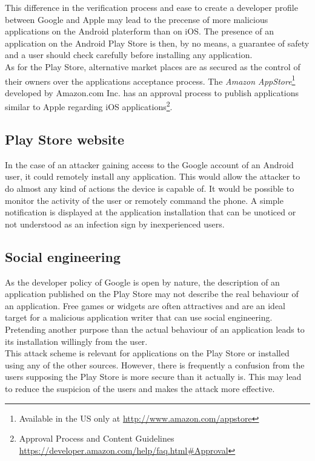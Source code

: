 This difference in the verification process and ease to create a developer profile between Google and Apple may lead to the precense of more malicious applications on the Android platerform than on iOS.
The presence of an application on the Android Play Store is then, by no means, a guarantee of safety and a user should check carefully before installing any application.\\

As for the Play Store, alternative market places are as secured as the control of their owners over the applications acceptance process.
The \emph{Amazon AppStore}\footnote{Available in the US only at \url{http://www.amazon.com/appstore}} developed by Amazon.com Inc. has an approval process to publish applications similar to Apple regarding iOS applications\footnote{Approval Process and Content Guidelines \url{https://developer.amazon.com/help/faq.html#Approval}}.

\subsection{Play Store website}

In the case of an attacker gaining access to the Google account of an Android user, it could remotely install any application.
This would allow the attacker to do almost any kind of actions the device is capable of.
It would be possible to monitor the activity of the user or remotely command the phone.
A simple notification is displayed at the application installation that can be unoticed or not understood as an infection sign by inexperienced users.

\subsection{Social engineering}

As the developer policy of Google is open by nature, the description of an application published on the Play Store may not describe the real behaviour of an application.
Free games or widgets are often attractives and are an ideal target for a malicious application writer that can use social engineering.
Pretending another purpose than the actual behaviour of an application leads to its installation willingly from the user.\\

This attack scheme is relevant for applications on the Play Store or installed using any of the other sources.
However, there is frequently a confusion from the users supposing the Play Store is more secure than it actually is.
This may lead to reduce the suspicion of the users and makes the attack more effective.\\

